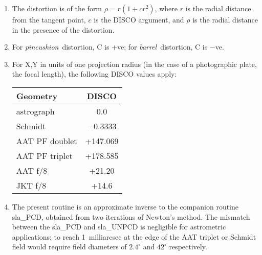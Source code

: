 {
 \begin{enumerate}
  \item The distortion is of the form $\rho = r (1 + c r^{2})$, where $r$ is
        the radial distance from the tangent point, $c$ is the DISCO
        argument, and $\rho$ is the radial distance in the presence of
        the distortion.
  \item For {\it pincushion}\, distortion, C is +ve;  for
        {\it barrel}\, distortion, C is $-$ve.
  \item For X,Y in units of one projection radius (in the case of
        a photographic plate, the focal length), the following
        DISCO values apply:

        \vspace{2ex}

        \hspace{5em}
        \begin{tabular}{|l|c|} \hline
         Geometry & DISCO \\ \hline \hline
         astrograph & 0.0 \\ \hline
         Schmidt & $-$0.3333 \\ \hline
         AAT PF doublet & +147.069 \\ \hline
         AAT PF triplet & +178.585 \\ \hline
         AAT f/8 & +21.20 \\ \hline
         JKT f/8 & +14.6 \\ \hline
        \end{tabular}

        \vspace{2ex}

  \item The present routine is an approximate inverse to the
        companion routine sla\_PCD, obtained from two iterations
        of Newton's method.  The mismatch between the sla\_PCD
        and sla\_UNPCD is negligible for astrometric applications;
        to reach 1~milliarcsec at the edge of the AAT triplet or
        Schmidt field would require field diameters of $2.4^{\circ}$
        and $42^{\circ}$ respectively.
 \end{enumerate}
}
{
}
{
  \\
}
